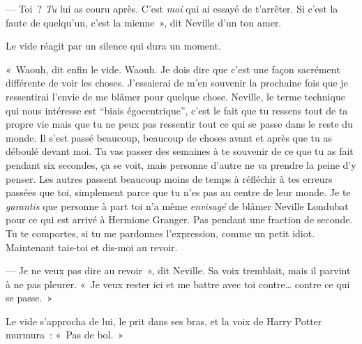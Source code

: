 --- Toi~?
\emph{Tu} lui as couru après.
C'est \emph{moi} qui ai essayé de t'arrêter.
Si c'est la faute de quelqu'un, c'est la mienne~», dit Neville d'un ton amer.

Le vide réagit par un silence qui dura un moment.

«~Waouh, dit enfin le vide.
Waouh. Je dois dire que c'est une façon sacrément différente de voir les choses.
J'essaierai de m'en souvenir la prochaine fois que je ressentirai l'envie de me blâmer pour quelque chose.
Neville, le terme technique qui nous intéresse est “biais égocentrique”, c'est le fait que tu ressens tout de ta propre vie mais que tu ne peux pas ressentir tout ce qui se passe dans le reste du monde.
Il s'est passé beaucoup, beaucoup de choses avant et après que tu as déboulé devant moi.
Tu vas passer des semaines à te souvenir de ce que tu as fait pendant six secondes, ça se voit, mais personne d'autre ne va prendre la peine d'y penser.
Les autres passent beaucoup moins de temps à réfléchir à tes erreurs passées que toi, simplement parce que tu n'es pas au centre de leur monde.
Je te \emph{garantis} que personne à part toi n'a même \emph{envisagé} de blâmer Neville Londubat pour ce qui est arrivé à Hermione Granger.
Pas pendant une fraction de seconde.
Tu te comportes, si tu me pardonnes l'expression, comme un petit idiot.
Maintenant tais-toi et dis-moi au revoir.

--- Je ne veux pas dire au revoir~», dit Neville.
Sa voix tremblait, mais il parvint à ne pas pleurer.
«~Je veux rester ici et me battre avec toi contre… contre ce qui se passe.~»

Le vide s'approcha de lui, le prit dans ses bras, et la voix de Harry Potter murmura~: «~Pas de bol.~»
